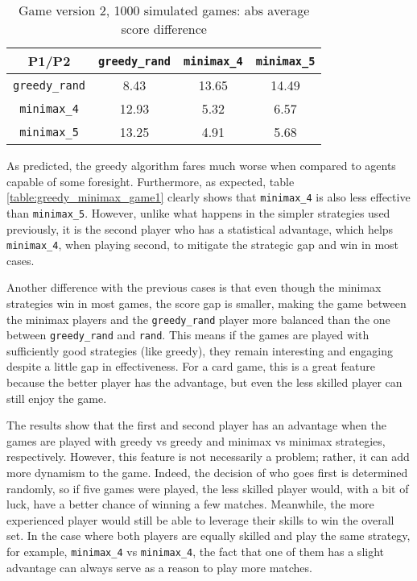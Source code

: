 \documentclass[conference]{IEEEtran}
\begin{document}
\begin{table}[hbt!]
\begin{center}
\begin{tabular}{|c||c|c|c|}
    \hline
    P1/P2 &  \verb|greedy_rand| & \verb|minimax_4| & \verb|minimax_5|\\
    \hline \hline
    \verb|greedy_rand| &  8.43 & 13.65 &  14.49\\ 
    \hline
    \verb|minimax_4|  &  12.93 &  5.32 &  6.57\\ 
    \hline
    \verb|minimax_5|  & 13.25 &  4.91 &  5.68\\ 
    
    \hline
\end{tabular}
\caption{Game version 2, 1000 simulated games: abs average score difference}
\end{center}
\end{table}


As predicted, the greedy algorithm fares much worse when compared to agents capable of some foresight. Furthermore, as expected, table \ref{table:greedy_minimax_game1} clearly shows that \verb|minimax_4| is also less effective than \verb|minimax_5|. However, unlike what happens in the simpler strategies used previously, it is the second player who has a statistical advantage, which helps \verb|minimax_4|, when playing second, to mitigate the strategic gap and win in most cases.

Another difference with the previous cases is that even though the minimax strategies win in most games, the score gap is smaller, making the game between the minimax players and the \verb|greedy_rand| player more balanced than the one between \verb|greedy_rand| and \verb|rand|. This means if the games are played with sufficiently good strategies (like greedy), they remain interesting and engaging despite a little gap in effectiveness. For a card game, this is a great feature because the better player has the advantage, but even the less skilled player can still enjoy the game.

The results show that the first and second player has an advantage when the games are played with greedy vs greedy and minimax vs minimax strategies, respectively. However, this feature is not necessarily a problem; rather, it can add more dynamism to the game. Indeed, the decision of who goes first is determined randomly, so if five games were played, the less skilled player would, with a bit of luck, have a better chance of winning a few matches. Meanwhile, the more experienced player would still be able to leverage their skills to win the overall set. In the case where both players are equally skilled and play the same strategy, for example, \verb|minimax_4| vs \verb|minimax_4|, the fact that one of them has a slight advantage can always serve as a reason to play more matches.
\end{document}
